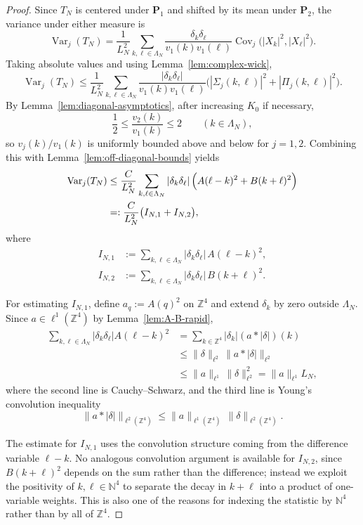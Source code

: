 \documentclass[11pt, reqno]{amsart}
\theoremstyle{remark}
\newcommand{\N}{\mathbb{N}}
\newcommand{\Z}{\mathbb{Z}}
\newcommand{\1}{\mathbf{1}}
\newcommand{\abs}[1]{\left\lvert #1 \right\rvert}
\begin{document}
\begin{proof}
Since $T_N$ is centered under $\mathbf P_1$ and shifted by its mean under $\mathbf P_2$, the variance under either measure is
\[
\operatorname{Var}_j(T_N)
=\frac1{L_N^2}\sum_{k,\ell\in\Lambda_N}
\frac{\delta_k\delta_\ell}{v_1(k)v_1(\ell)}
\operatorname{Cov}_j\big(\abs{X_k}^2,\abs{X_\ell}^2\big).
\]
Taking absolute values and using Lemma~\ref{lem:complex-wick},
\[
\operatorname{Var}_j(T_N)
\le \frac1{L_N^2}\sum_{k,\ell\in\Lambda_N}
\frac{\abs{\delta_k\delta_\ell}}{v_1(k)v_1(\ell)}
\Big(\abs{\Sigma_j(k,\ell)}^2+\abs{\Pi_j(k,\ell)}^2\Big).
\]
By Lemma~\ref{lem:diagonal-asymptotics}, after increasing $K_0$ if necessary,
\[
\frac12\le \frac{v_2(k)}{v_1(k)}\le 2\qquad (k\in\Lambda_N),
\]
so $v_j(k)/v_1(k)$ is uniformly bounded above and below for $j=1,2$. 
Combining this with Lemma~\ref{lem:off-diagonal-bounds} yields
\begin{align}
\operatorname{Var}_j(T_N)
&\le \frac{C}{L_N^2}\sum_{k,\ell\in\Lambda_N}\abs{\delta_k\delta_\ell}
\Big(A(\ell-k)^2+B(k+\ell)^2\Big) \notag\\
&=: \frac{C}{L_N^2}\big(I_{N,1}+I_{N,2}\big),
\label{eq:var-split}
\end{align}
where
\begin{align*}
I_{N,1}
&:= \sum_{k,\ell\in\Lambda_N}\abs{\delta_k\delta_\ell}\,A(\ell-k)^2,\\
I_{N,2}
&:= \sum_{k,\ell\in\Lambda_N}\abs{\delta_k\delta_\ell}\,B(k+\ell)^2.
\end{align*}

For estimating $I_{N,1}$, define $a_q:=A(q)^2$ on $\Z^4$ and extend $\delta_k$ by zero outside $\Lambda_N$. Since $a\in\ell^1(\Z^4)$ by Lemma~\ref{lem:A-B-rapid},
\begin{align*}
\sum_{k,\ell\in\Lambda_N}\abs{\delta_k\delta_\ell}A(\ell-k)^2
&=\sum_{k\in\Z^4}\abs{\delta_k}(a*\abs{\delta})(k)
\\
&\le \|\delta\|_{\ell^2}\,\|a*\abs{\delta}\|_{\ell^2}
\\
&\le \|a\|_{\ell^1}\,\|\delta\|_{\ell^2}^2
=\|a\|_{\ell^1}L_N,
\end{align*}
where the second line is Cauchy--Schwarz, and the third line is Young's convolution inequality
\[
\|a*\abs{\delta}\|_{\ell^2(\mathbb Z^4)}
\le
\|a\|_{\ell^1(\mathbb Z^4)}\,\|\delta\|_{\ell^2(\mathbb Z^4)}.
\]

The estimate for \(I_{N,1}\) uses the convolution structure coming from the
difference variable \(\ell-k\). No analogous convolution argument is available
for \(I_{N,2}\), since \(B(k+\ell)^2\) depends on the sum rather than the
difference; instead we exploit the positivity of \(k,\ell\in\mathbb N^4\) to
separate the decay in \(k+\ell\) into a product of one-variable weights.
This is also one of the reasons for indexing the statistic by $\N^4$ rather than by all of $\Z^4$.


\end{proof}
\end{document}
